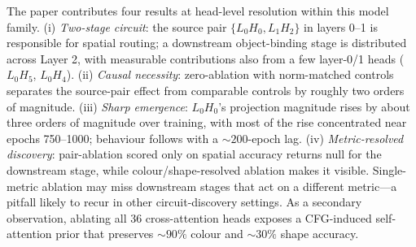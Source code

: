 \documentclass{article}
\theoremstyle{plain}
\theoremstyle{definition}
\begin{document}
The paper contributes four results at head-level resolution within this model family.
(i) \emph{Two-stage circuit}: the source pair $\{L_0H_0, L_1H_2\}$ in layers 0--1 is responsible for spatial routing; a downstream object-binding stage is distributed across Layer 2, with measurable contributions also from a few layer-0/1 heads ($L_0H_5$, $L_0H_4$).
(ii) \emph{Causal necessity}: zero-ablation with norm-matched controls separates the source-pair effect from comparable controls by roughly two orders of magnitude.
(iii) \emph{Sharp emergence}: $L_0H_0$'s projection magnitude rises by about three orders of magnitude over training, with most of the rise concentrated near epochs 750--1000; behaviour follows with a $\sim\!200$-epoch lag.
(iv) \emph{Metric-resolved discovery}: pair-ablation scored only on spatial accuracy returns null for the downstream stage, while colour/shape-resolved ablation makes it visible. Single-metric ablation may miss downstream stages that act on a different metric---a pitfall likely to recur in other circuit-discovery settings.
As a secondary observation, ablating all 36 cross-attention heads exposes a CFG-induced self-attention prior that preserves $\sim\!90\%$ colour and $\sim\!30\%$ shape accuracy.
\end{document}

